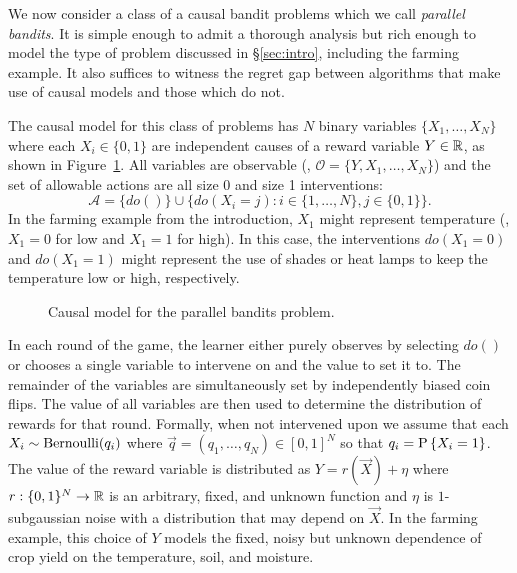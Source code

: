 We now consider a class of a causal bandit problems which we call \emph{parallel bandits}.
It is simple enough to admit a thorough analysis but rich enough to model the type of problem discussed in \S\ref{sec:intro}, including the farming example. It also suffices to witness the regret gap between algorithms that make use of causal models and those which do not.

The causal model for this class of problems has $N$ binary variables $\{ X_1, \ldots, X_N \}$ where each $X_i \in \{0,1\}$ are independent causes of a reward variable $Y \in \R$, as shown in Figure~\ref{fig:causalStructure}.
All variables are observable (\ie, $\mathcal{O} = \{Y, X_1, \ldots, X_N\}$) and the set of allowable actions are all size 0 and size 1 interventions: 
\[
	\mathcal{A} = \{do()\} \cup \{ do(X_i = j) \colon i \in \{1, \ldots, N\}, j \in \{0,1\}\}.
\]
In the farming example from the introduction, $X_1$ might represent temperature (\eg, $X_1=0$ for low and $X_1=1$ for high). 
In this case, the interventions $do(X_1 = 0)$ and $do(X_1 = 1)$ might represent the use of shades or heat lamps to keep the temperature low or high, respectively.


\begin{figure}[h]
\centering
{}
\caption{Causal model for the parallel bandits problem.\label{fig:causalStructure}}
\end{figure}

In each round of the game, the learner either purely observes by selecting $do()$ or chooses a single variable to intervene on and the value to set it to. 
The remainder of the variables are simultaneously set by independently biased coin flips. 
The value of all variables are then used to determine the distribution of rewards for that round.
Formally, when not intervened upon we assume that each $X_i \sim \bernoulli(q_i)$ where $\vec{q} = (q_1, \ldots, q_N) \in [0,1]^N$ so that $q_i = \P{X_i = 1}$.
The value of the reward variable is distributed as $Y = r(\vec{X}) + \eta$ where $r : \{0,1\}^N \to \R$ is an arbitrary, fixed, and unknown function and $\eta$ is $1$-subgaussian noise with a distribution that may depend on $\vec{X}$.
In the farming example, this choice of $Y$ models the fixed, noisy but unknown dependence of crop yield on the temperature, soil, and moisture.

